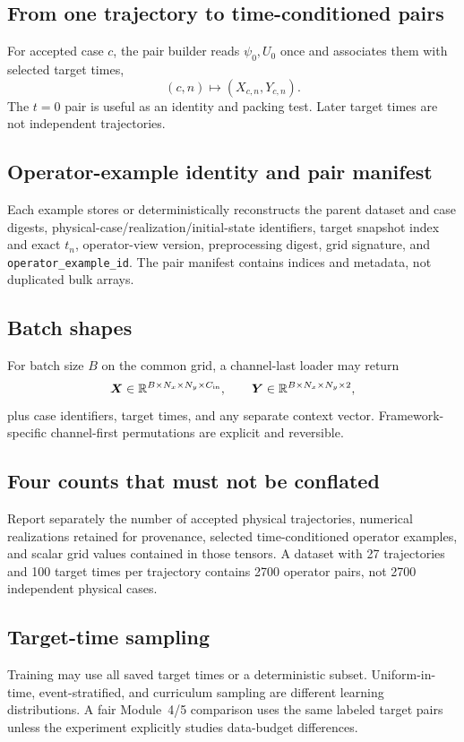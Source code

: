 \documentclass[11pt]{article}
\newcommand{\mat}[1]{\bm{#1}}
\newcommand{\code}[1]{\texttt{#1}}
\begin{document}
\subsection{From one trajectory to time-conditioned pairs}
For accepted case $c$, the pair builder reads $\psi_0,U_0$ once and associates them with selected target times,
\begin{equation}
(c,n)\longmapsto(X_{c,n},Y_{c,n}).
\end{equation}
The $t=0$ pair is useful as an identity and packing test. Later target times are not independent trajectories.

\subsection{Operator-example identity and pair manifest}
Each example stores or deterministically reconstructs the parent dataset and case digests, physical-case/realization/initial-state identifiers, target snapshot index and exact $t_n$, operator-view version, preprocessing digest, grid signature, and \code{operator\_example\_id}. The pair manifest contains indices and metadata, not duplicated bulk arrays.

\subsection{Batch shapes}
For batch size $B$ on the common grid, a channel-last loader may return
\begin{equation}
\mat X\in\mathbb R^{B\times N_x\times N_y\times C_{\rm in}},\qquad
\mat Y\in\mathbb R^{B\times N_x\times N_y\times 2},
\end{equation}
plus case identifiers, target times, and any separate context vector. Framework-specific channel-first permutations are explicit and reversible.

\subsection{Four counts that must not be conflated}
Report separately the number of accepted physical trajectories, numerical realizations retained for provenance, selected time-conditioned operator examples, and scalar grid values contained in those tensors. A dataset with 27 trajectories and 100 target times per trajectory contains 2700 operator pairs, not 2700 independent physical cases.

\subsection{Target-time sampling}
Training may use all saved target times or a deterministic subset. Uniform-in-time, event-stratified, and curriculum sampling are different learning distributions. A fair Module~4/5 comparison uses the same labeled target pairs unless the experiment explicitly studies data-budget differences.
\end{document}
